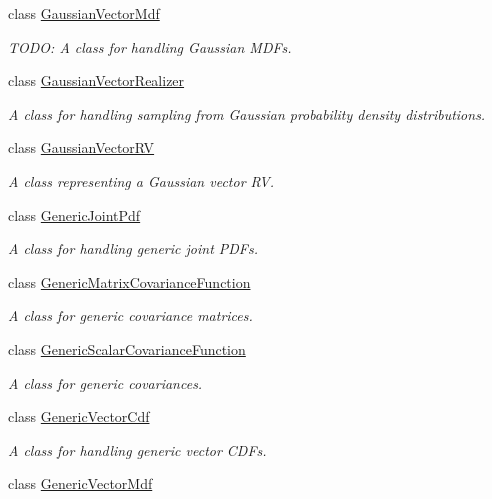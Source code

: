 \begin{DoxyCompactItemize}
class \hyperlink{class_q_u_e_s_o_1_1_gaussian_vector_mdf}{Gaussian\-Vector\-Mdf}
\begin{DoxyCompactList}\small\item\em T\-O\-D\-O\-: A class for handling Gaussian M\-D\-Fs. \end{DoxyCompactList}\item 
class \hyperlink{class_q_u_e_s_o_1_1_gaussian_vector_realizer}{Gaussian\-Vector\-Realizer}
\begin{DoxyCompactList}\small\item\em A class for handling sampling from Gaussian probability density distributions. \end{DoxyCompactList}\item 
class \hyperlink{class_q_u_e_s_o_1_1_gaussian_vector_r_v}{Gaussian\-Vector\-R\-V}
\begin{DoxyCompactList}\small\item\em A class representing a Gaussian vector R\-V. \end{DoxyCompactList}\item 
class \hyperlink{class_q_u_e_s_o_1_1_generic_joint_pdf}{Generic\-Joint\-Pdf}
\begin{DoxyCompactList}\small\item\em A class for handling generic joint P\-D\-Fs. \end{DoxyCompactList}\item 
class \hyperlink{class_q_u_e_s_o_1_1_generic_matrix_covariance_function}{Generic\-Matrix\-Covariance\-Function}
\begin{DoxyCompactList}\small\item\em A class for generic covariance matrices. \end{DoxyCompactList}\item 
class \hyperlink{class_q_u_e_s_o_1_1_generic_scalar_covariance_function}{Generic\-Scalar\-Covariance\-Function}
\begin{DoxyCompactList}\small\item\em A class for generic covariances. \end{DoxyCompactList}\item 
class \hyperlink{class_q_u_e_s_o_1_1_generic_vector_cdf}{Generic\-Vector\-Cdf}
\begin{DoxyCompactList}\small\item\em A class for handling generic vector C\-D\-Fs. \end{DoxyCompactList}\item 
class \hyperlink{class_q_u_e_s_o_1_1_generic_vector_mdf}{Generic\-Vector\-Mdf}

\end{DoxyCompactItemize}
